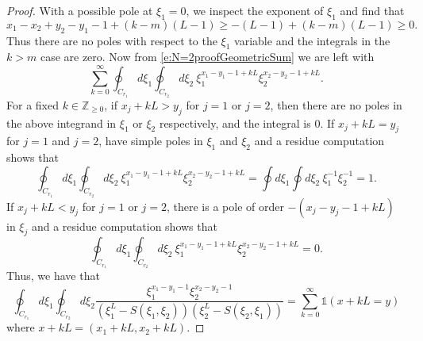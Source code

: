 \documentclass[a4paper,11pt]{article}
\theoremstyle{definition}
\begin{document}
\begin{proof}
With a possible pole at $\xi_1=0$, we inspect the exponent of $\xi_1$ and find that 
\begin{equation}
    x_1-x_2+y_2-y_1-1+(k-m)(L-1)\geq -(L-1)+(k-m)(L-1)\geq0.
\end{equation}
Thus there are no poles with respect to the $\xi_1$ variable and the integrals in the $k>m$ case are zero. Now from \eqref{e:N=2proofGeometricSum} we are left with 
\begin{equation}
    \sum_{k=0}^{\infty}\oint_{C_{r_1}} d\xi_1\oint_{C_{r_2}} d\xi_2 \ \xi_1^{x_1-y_1-1+kL}\xi_2^{x_2-y_2-1+kL}.
\end{equation}
For a fixed $k\in\mathbb{Z}_{\geq 0}$, if $x_j+kL>y_j$ for $j=1$ or $j=2$, then there are no poles in the above integrand in $\xi_1$ or $\xi_2$ respectively, and the integral is $0$. If $x_j+kL = y_j$ for $j=1$ and $j=2$, have simple poles in $\xi_1$ and $\xi_2$ and a residue computation shows that
\begin{equation}
    \oint_{C_{r_1}} d\xi_1\oint_{C_{r_2}} d\xi_2 \ \xi_1^{x_1-y_1-1+kL}\xi_2^{x_2-y_2-1+kL} = \oint d\xi_1\oint d\xi_2 \ \xi_1^{-1}\xi_2^{-1} =1.
\end{equation}
If $x_j+kL<y_j$ for $j=1$ or $j=2$, there is a pole of order $-(x_j-y_j-1+kL)$ in $\xi_j$ and a residue computation shows that
\begin{equation}
     \oint_{C_{r_1}} d\xi_1\oint_{C_{r_2}} d\xi_2 \ \xi_1^{x_1-y_1-1+kL}\xi_2^{x_2-y_2-1+kL} = 0.
\end{equation}
Thus, we have that 
\begin{equation}
    \oint_{C_{r_1}}d\xi_1\oint_{C_{r_2}}d\xi_2 \frac{\xi_1^{x_1-y_1-1}\xi_2^{x_2-y_2-1}}{\left(\xi_1^L - S(\xi_1,\xi_2) \right)\left(\xi_2^L - S(\xi_2,\xi_1) \right)} = \sum_{k=0}^\infty \mathds{1}(x+kL = y)
\end{equation}
where $x+kL = (x_1+kL, x_2+kL)$.


\end{proof}
\end{document}
